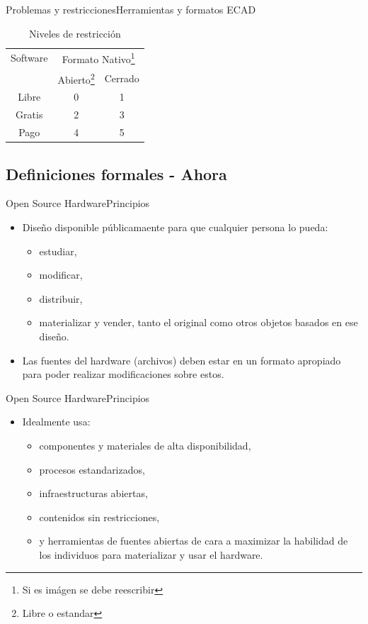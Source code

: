 \documentclass{beamer}
\begin{document}
\begin{frame}{Problemas y restricciones}{Herramientas y formatos ECAD}
  \begin{table}
    \begin{tabular}{|c|c|c|}
      \hline
      Software & \multicolumn{2}{c|}{Formato Nativo\footnote{Si es imágen se debe reescribir}}\\
       & Abierto\footnote{Libre o estandar} & Cerrado\\
      \hline
      Libre & 0 & 1\\
      Gratis & 2 & 3\\
      Pago & 4 & 5\\
      \hline
    \end{tabular}
    \caption{Niveles de restricción}
    \label{tab:niveles}
  \end{table}
\end{frame}

\subsection{Definiciones formales - Ahora}

\begin{frame}{Open Source Hardware}{Principios}
  \begin{itemize}
  \item Diseño disponible públicamaente para que cualquier persona lo pueda:
    \begin{itemize}
    \item estudiar,
    \item modificar,
    \item distribuir,
    \item materializar y vender, tanto el original como otros objetos basados en ese diseño.
    \end{itemize}
  \item Las fuentes del hardware (archivos) deben estar en un formato apropiado para poder realizar modificaciones sobre estos.
  \end{itemize}
\end{frame}

\begin{frame}{Open Source Hardware}{Principios}
  \begin{itemize}
    \item Idealmente usa:
    \begin{itemize}
    \item componentes y materiales de alta disponibilidad,
    \item procesos estandarizados,
    \item infraestructuras abiertas,
    \item contenidos sin restricciones,
    \item y herramientas de fuentes abiertas de cara a maximizar la habilidad de los individuos para materializar y usar el hardware.
    \end{itemize}
  \end{itemize}
\end{frame}
\end{document}
